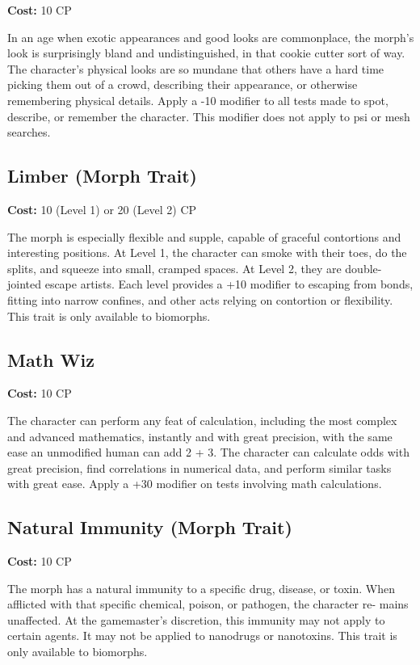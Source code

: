 \textbf{Cost:} 10 CP 

In an age when exotic appearances and good looks are commonplace, the morph’s look is surprisingly bland and undistinguished, in that cookie cutter sort of way. The character’s physical looks are so mundane that others have a hard time picking them out of a crowd, describing their appearance, or otherwise remembering physical details. Apply a -10 modifier to all tests made to spot, describe, or remember the character. This modifier does not apply to psi or mesh searches. 

\subsection{Limber (Morph Trait)} \label{sec:traits-limber} 

\textbf{Cost:} 10 (Level 1) or 20 (Level 2) CP 

The morph is especially flexible and supple, capable of graceful contortions and interesting positions. At Level 1, the character can smoke with their toes, do the splits, and squeeze into small, cramped spaces. At Level 2, they are double-jointed escape artists. Each level provides a +10 modifier to escaping from bonds, fitting into narrow confines, and other acts relying on contortion or flexibility. This trait is only available to biomorphs. 

\subsection{Math Wiz} \label{sec:traits-mathwiz} \textbf{Cost:} 10 CP 

The character can perform any feat of calculation, including the most complex and advanced mathematics, instantly and with great precision, with the same ease an unmodified human can add 2 + 3. The character can calculate odds with great precision, find correlations in numerical data, and perform similar tasks with great ease. Apply a +30 modifier on tests involving math calculations. 

\subsection{Natural Immunity (Morph Trait)} \label{sec:traits-natural-immunity} 

\textbf{Cost:} 10 CP 

The morph has a natural immunity to a specific drug, disease, or toxin. When afflicted with that specific chemical, poison, or pathogen, the character re- mains unaffected. At the gamemaster’s discretion, this immunity may not apply to certain agents. It may not be applied to nanodrugs or nanotoxins. This trait is only available to biomorphs. 

